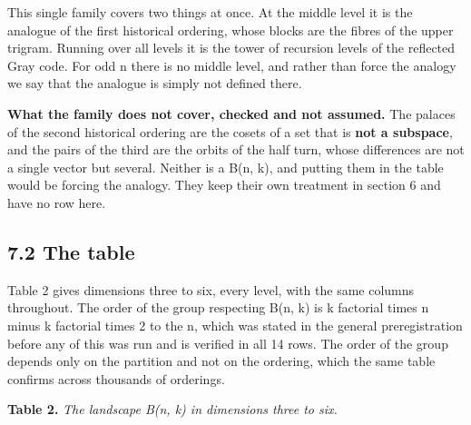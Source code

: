 \documentclass[11pt,a4paper]{article}
\begin{document}
This single family covers two things at once. At the middle level it is the analogue of the first historical ordering, whose blocks are the fibres of the upper trigram. Running over all levels it is the tower of recursion levels of the reflected Gray code. For odd n there is no middle level, and rather than force the analogy we say that the analogue is simply not defined there.

\textbf{What the family does not cover, checked and not assumed.} The palaces of the second historical ordering are the cosets of a set that is \textbf{not a subspace}, and the pairs of the third are the orbits of the half turn, whose differences are not a single vector but several. Neither is a B(n, k), and putting them in the table would be forcing the analogy. They keep their own treatment in section 6 and have no row here.

\subsection*{7.2 The table}

Table 2 gives dimensions three to six, every level, with the same columns throughout. The order of the group respecting B(n, k) is k factorial times n minus k factorial times 2 to the n, which was stated in the general preregistration before any of this was run and is verified in all 14 rows. The order of the group depends only on the partition and not on the ordering, which the same table confirms across thousands of orderings.

\textbf{Table 2.} \emph{The landscape B(n, k) in dimensions three to six.}
\end{document}
